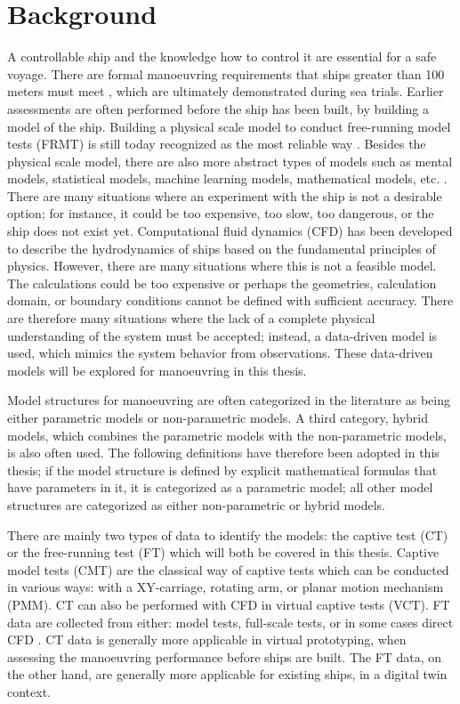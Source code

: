 \section{Background}
A controllable ship and the knowledge how to control it are essential for a safe voyage.
There are formal manoeuvring requirements that ships greater than 100 meters must meet \cite{imoStandardsShipManoeuvrability2002}, which are ultimately demonstrated during sea trials. Earlier assessments are often performed before the ship has been built, by building a model of the ship. Building a physical scale model to conduct free-running model tests (FRMT) is still today recognized as the most reliable way \cite{ittcManeuveringCommitteeITTC2008}. Besides the physical scale model, there are also more abstract types of models such as mental models, statistical models, machine learning models, mathematical models, etc.
 \cite{ljungModelingIdentificationDynamic2021}.
There are many situations where an experiment with the ship is not a desirable option; for instance, it could be too expensive, too slow, too dangerous, or the ship does not exist yet.  
Computational fluid dynamics (CFD) has been developed to describe the hydrodynamics of ships based on the fundamental principles of physics. However, there are many situations where this is not a feasible model. The calculations could be too expensive or perhaps the geometries, calculation domain, or boundary conditions cannot be defined with sufficient accuracy. There are therefore many situations where the lack of a complete physical understanding of the system must be accepted; instead, a data-driven model is used, which mimics the system behavior from observations. These data-driven models will be explored for manoeuvring in this thesis.  

Model structures for manoeuvring are often categorized in the literature as being either parametric models or non-parametric models. A third category, hybrid models, which combines the parametric models with the non-parametric models, is also often used. 
The following definitions have therefore been adopted in this thesis;
if the model structure is defined by explicit mathematical formulas that have parameters in it, it is categorized as a parametric model; all other model structures are categorized as either non-parametric or hybrid models. 

There are mainly two types of data to identify the models: the captive test (CT) or the free-running test (FT) which will both be covered in this thesis. Captive model tests (CMT) are the classical way of captive tests which can be conducted in various ways: with a XY-carriage, rotating arm, or planar motion mechanism (PMM). CT can also be performed with CFD in virtual captive tests (VCT). 
FT data are collected from either: model tests, full-scale tests, or in some cases direct CFD \cite{arakiEstimatingManeuveringCoefficients2012}.
CT data is generally more applicable in virtual prototyping, when assessing the manoeuvring performance before ships are built. The FT data, on the other hand, are generally more applicable for existing ships, in a digital twin context. 

